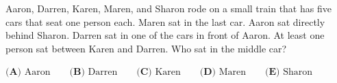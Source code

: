Aaron, Darren, Karen, Maren, and Sharon rode on a small train that has five cars that seat one person each. Maren sat in the last car. Aaron sat directly behind Sharon. Darren sat in one of the cars in front of Aaron. At least one person sat between Karen and Darren. Who sat in the middle car?

$\textbf{(A) }\text{Aaron} \qquad \textbf{(B) }\text{Darren} \qquad \textbf{(C) }\text{Karen} \qquad \textbf{(D) }\text{Maren}\qquad \textbf{(E) }\text{Sharon}$
